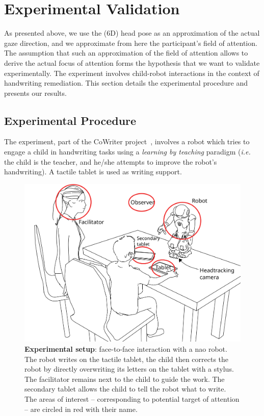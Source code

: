 \documentclass{sig-alternate}
\newcommand{\ie}{\textit{i.e.}\xspace}
\begin{document}

\section{Experimental Validation}
\label{sec:expe}

As presented above, we use the (6D) head pose as an approximation of the
actual gaze direction, and we approximate from here the participant's field of
attention. The assumption that such an approximation of the field of attention
allows to derive the actual focus of attention forms the hypothesis that we
want to validate experimentally. The experiment involves child-robot
interactions in the context of handwriting remediation.
This section details the experimental procedure and presents our results.


\subsection{Experimental Procedure}

The experiment, part of the CoWriter project~\cite{Hood:2015}, involves a robot
which tries to engage a child in handwriting tasks using a \emph{learning by teaching}
paradigm (\ie the child is the teacher, and he/she attempts to improve the
robot's handwriting). A tactile tablet is used as writing support.

\begin{figure}[h!]
    \centering
    \includegraphics[width=0.8\columnwidth]{experimental_setup}
    \caption{\small \textbf{Experimental setup}: face-to-face interaction with a {\sc
            nao} robot. The robot writes on the tactile tablet, the child then
            corrects the robot by directly overwriting its letters on the tablet
            with a stylus. The facilitator remains next to the child to guide the work. 
            The secondary tablet allows the child to tell the robot what to
            write. The areas of interest -- corresponding to potential target of
            attention -- are circled in red with their name.}
    \label{fig:setup}
\end{figure}
\end{document}
